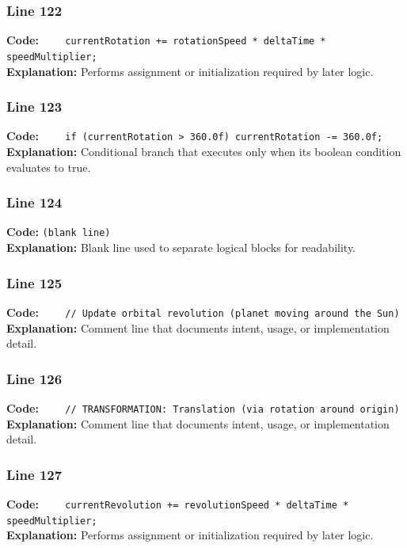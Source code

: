 \documentclass[11pt,a4paper]{article}
\begin{document}
\subsubsection*{Line 122}
\textbf{Code:} \verb|    currentRotation += rotationSpeed * deltaTime * speedMultiplier;|\\
\textbf{Explanation:} Performs assignment or initialization required by later logic.

\subsubsection*{Line 123}
\textbf{Code:} \verb|    if (currentRotation > 360.0f) currentRotation -= 360.0f;|\\
\textbf{Explanation:} Conditional branch that executes only when its boolean condition evaluates to true.

\subsubsection*{Line 124}
\textbf{Code:} \texttt{(blank line)}\\
\textbf{Explanation:} Blank line used to separate logical blocks for readability.

\subsubsection*{Line 125}
\textbf{Code:} \verb|    // Update orbital revolution (planet moving around the Sun)|\\
\textbf{Explanation:} Comment line that documents intent, usage, or implementation detail.

\subsubsection*{Line 126}
\textbf{Code:} \verb|    // TRANSFORMATION: Translation (via rotation around origin)|\\
\textbf{Explanation:} Comment line that documents intent, usage, or implementation detail.

\subsubsection*{Line 127}
\textbf{Code:} \verb|    currentRevolution += revolutionSpeed * deltaTime * speedMultiplier;|\\
\textbf{Explanation:} Performs assignment or initialization required by later logic.
\end{document}
